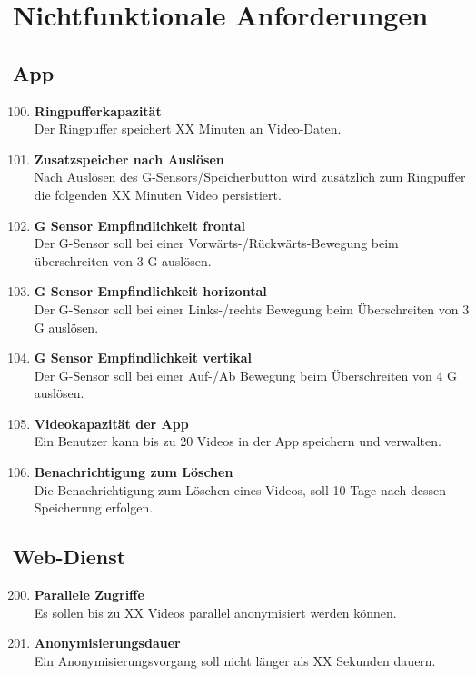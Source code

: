 \chapter{Nichtfunktionale Anforderungen}

\section{App}
\begin{enumerate}[\bfseries{NA}10]
\setcounter{enumi}{99}
\item \textbf{Ringpufferkapazität} \hfill\\ Der Ringpuffer speichert XX Minuten an Video-Daten.

\item \textbf{Zusatzspeicher nach Auslösen} \hfill\\ Nach Auslösen des G-Sensors/Speicherbutton wird zusätzlich zum Ringpuffer die folgenden XX Minuten Video persistiert.

\item \textbf{G Sensor Empfindlichkeit frontal} \hfill\\  Der G-Sensor soll bei einer Vorwärts-/Rückwärts-Bewegung beim überschreiten von 3 G auslösen.

\item \textbf{G Sensor Empfindlichkeit horizontal} \hfill\\  Der G-Sensor soll bei einer Links-/rechts Bewegung beim Überschreiten von 3 G auslösen.

\item \textbf{G Sensor Empfindlichkeit vertikal} \hfill\\  Der G-Sensor soll bei einer Auf-/Ab Bewegung beim Überschreiten von 4 G auslösen.

\item \textbf{Videokapazität der App} \hfill\\  Ein Benutzer kann bis zu 20 Videos in der App speichern und verwalten.

\item \textbf{Benachrichtigung zum Löschen} \hfill\\  Die Benachrichtigung zum Löschen eines Videos, soll 10 Tage nach dessen Speicherung erfolgen.
\end{enumerate}

\section{Web-Dienst}
\begin{enumerate}[\bfseries{NA}10]
\setcounter{enumi}{199}

\item \textbf{Parallele Zugriffe} \hfill\\  Es sollen bis zu XX Videos parallel anonymisiert werden können.

\item \textbf{Anonymisierungsdauer} \hfill\\  Ein Anonymisierungsvorgang soll nicht länger als XX Sekunden dauern.
\end{enumerate}

